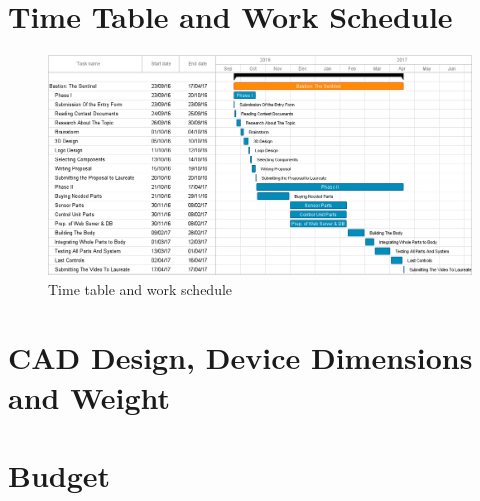 \documentclass[12pt,a4paper]{article}
\begin{document}
 \section{Time Table and Work Schedule}
  \begin{flushleft}
   \begin{figure}[h!]
   \begin{center}
    \includegraphics[scale=0.4]{time_schedule}
    \caption{Time table and work schedule}
   \end{center}
  \end{figure}
  \end{flushleft}
  
  \pagebreak
 \section{CAD Design, Device Dimensions and Weight}
  \begin{flushleft}
   
  \end{flushleft}

 \section{Budget}
\end{document}
